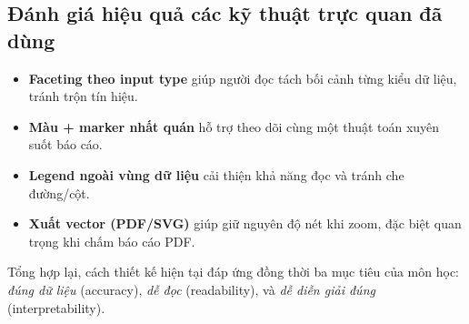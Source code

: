 \subsection{Đánh giá hiệu quả các kỹ thuật trực quan đã dùng}

\begin{itemize}[leftmargin=1.2cm]
    \item \textbf{Faceting theo input type} giúp người đọc tách bối cảnh từng kiểu dữ liệu, tránh trộn tín hiệu.
    \item \textbf{Màu + marker nhất quán} hỗ trợ theo dõi cùng một thuật toán xuyên suốt báo cáo.
    \item \textbf{Legend ngoài vùng dữ liệu} cải thiện khả năng đọc và tránh che đường/cột.
    \item \textbf{Xuất vector (PDF/SVG)} giúp giữ nguyên độ nét khi zoom, đặc biệt quan trọng khi chấm báo cáo PDF.
\end{itemize}

Tổng hợp lại, cách thiết kế hiện tại đáp ứng đồng thời ba mục tiêu của môn học:
\textit{đúng dữ liệu} (accuracy), \textit{dễ đọc} (readability), và \textit{dễ diễn giải đúng} (interpretability).
